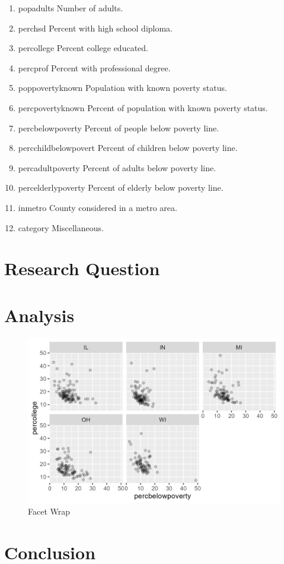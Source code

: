 \documentclass[12pt,a4paper]{article}
\begin{document}
\begin{enumerate}
\item popadults
Number of adults.

\item perchsd
Percent with high school diploma.

\item percollege
Percent college educated.

\item percprof
Percent with professional degree.

\item poppovertyknown
Population with known poverty status.

\item percpovertyknown
Percent of population with known poverty status.

\item percbelowpoverty
Percent of people below poverty line.

\item percchildbelowpovert
Percent of children below poverty line.

\item percadultpoverty
Percent of adults below poverty line.

\item percelderlypoverty
Percent of elderly below poverty line.

\item inmetro
County considered in a metro area.

\item category
Miscellaneous.

\end{enumerate}



\section*{Research Question}

\section*{Analysis}
\begin{figure}[h!]\centering
	\caption{\footnotesize Facet Wrap}
	\includegraphics[width=.75\textwidth]{facet_wrap.png}
\end{figure} 

\section*{Conclusion}
\end{document}
